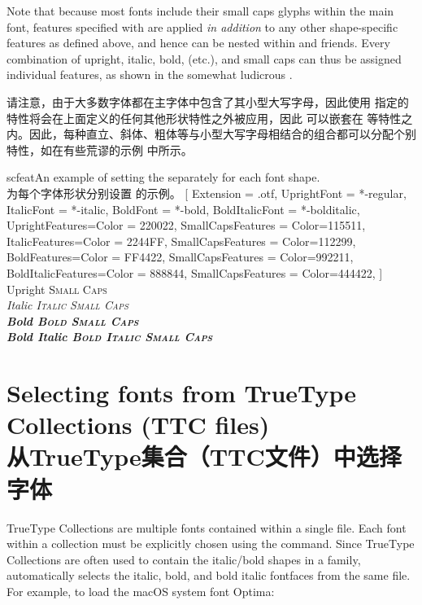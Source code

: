 \documentclass[a4paper]{l3doc}
\begin{document}
Note that because most fonts include their small caps glyphs
within the main font, features specified with  are applied \emph{in addition} to
any other shape-specific features as defined above, and hence 
can be nested within  and friends. Every combination
of upright, italic, bold, (etc.), and small caps can thus be assigned individual
features, as shown in the somewhat ludicrous .


请注意，由于大多数字体都在主字体中包含了其小型大写字母，因此使用  指定的特性将会在上面定义的任何其他形状特性之外被应用，因此  可以嵌套在  等特性之内。因此，每种直立、斜体、粗体等与小型大写字母相结合的组合都可以分配个别特性，如在有些荒谬的示例  中所示。

\begin{Xexample}{scfeat}{An example of setting the 
separately for each font shape.\\为每个字体形状分别设置  的示例。}
  [
      Extension = {.otf},
      UprightFont = {*-regular}, ItalicFont = {*-italic},
      BoldFont = {*-bold}, BoldItalicFont = {*-bolditalic},
      UprightFeatures={Color = 220022,
           SmallCapsFeatures = {Color=115511}},
       ItalicFeatures={Color = 2244FF,
           SmallCapsFeatures = {Color=112299}},
         BoldFeatures={Color = FF4422,
           SmallCapsFeatures = {Color=992211}},
   BoldItalicFeatures={Color = 888844,
           SmallCapsFeatures = {Color=444422}},
           ]
  Upright {\scshape Small Caps}\\
  \itshape Italic {\scshape Italic Small Caps}\\
  \upshape\bfseries Bold {\scshape Bold Small Caps}\\
  \itshape Bold Italic {\scshape Bold Italic Small Caps}
\end{Xexample}


\section{Selecting fonts from TrueType Collections (TTC files)\\从TrueType集合（TTC文件）中选择字体}
TrueType Collections are multiple fonts contained within a single file.
Each font within a collection must be explicitly chosen using the  command.
Since TrueType Collections are often used to contain the italic/bold shapes in a family,  automatically selects the italic, bold, and bold italic fontfaces from the same file.
For example, to load the macOS system font Optima:
\end{document}
